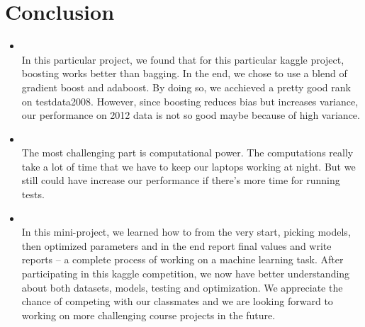 \section{Conclusion}
\medskip
\begin{itemize}

    \item {} \\
    In this particular project, we found that for this particular kaggle project, boosting works better than bagging. In the end, we chose to use a blend of gradient boost and adaboost. By doing so, we acchieved a pretty good rank on testdata2008. However, since boosting reduces bias but increases variance, our performance on 2012 data is not so good maybe because of high variance.
    \item {} \\
    The most challenging part is computational power. The computations really take a lot of time that we have to keep our laptops working at night. But we still could have increase our performance if there's more time for running tests.
    \item {} \\
    In this mini-project, we learned how to from the very start, picking models, then optimized parameters and in the end report final values and write reports -- a complete process of working on a machine learning task. After participating in this kaggle competition, we now have better understanding about both datasets, models, testing and optimization. We appreciate the chance of competing with our classmates and we are looking forward to working on more challenging course projects in the future.
\end{itemize}




